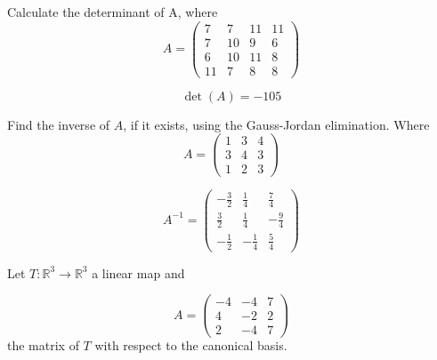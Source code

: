 \begin{questions}

\question Calculate the determinant of A, where
$$
A=\left(\begin{array}{rrrr}
7 & 7 & 11 & 11 \\
7 & 10 & 9 & 6 \\
6 & 10 & 11 & 8 \\
11 & 7 & 8 & 8
\end{array}\right)
$$

\begin{solution}
$$\det(A)=-105$$
\end{solution}

\question Find the inverse of $A$, if it exists, using the Gauss-Jordan elimination. Where
$$
A=\left(\begin{array}{rrr}
1 & 3 & 4 \\
3 & 4 & 3 \\
1 & 2 & 3
\end{array}\right)
$$

\begin{solution}
$$A^{-1}=\left(\begin{array}{rrr}
-\frac{3}{2} & \frac{1}{4} & \frac{7}{4} \\
\frac{3}{2} & \frac{1}{4} & -\frac{9}{4} \\
-\frac{1}{2} & -\frac{1}{4} & \frac{5}{4}
\end{array}\right)$$
\end{solution}

\question Let $T:\mathbb{R}^3\rightarrow\mathbb{R}^3$  a linear map and
 
$$
A=\left(\begin{array}{rrr}
-4 & -4 & 7 \\
4 & -2 & 2 \\
2 & -4 & 7
\end{array}\right)
$$
the matrix of $T$ with respect to the canonical basis.
\end{questions}
